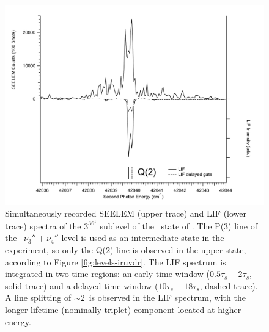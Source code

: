 \documentclass[12pt]{mitthesis}
\begin{document}
\begin{figure}
  \caption{Simultaneously recorded SEELEM (upper trace) and LIF (lower
    trace) spectra of the $3^36^1$  sublevel of the \astate\
    state of .  The P(3) line of the \xstate\ $\nu_3'' +
    \nu_4''$ level is used as an intermediate state in the experiment,
    so only the Q(2) line is observed in the upper state, according to
    Figure \ref{fig:levels-iruvdr}.  The LIF spectrum is integrated in
    two time regions: an early time window ($0.5\tau_s-2\tau_s$, solid
    trace) and a delayed time window ($10\tau_s-18\tau_s$, dashed
    trace).  A line splitting of $\sim 2$\rcm\ is observed in the LIF
    spectrum, with the longer-lifetime (nominally triplet) component
    located at higher energy.}
  \label{fig:3361-q2}
  \centering
  \includegraphics[width=6in]{spectrum-3361-q2-split.pdf}
\end{figure}
\end{document}
